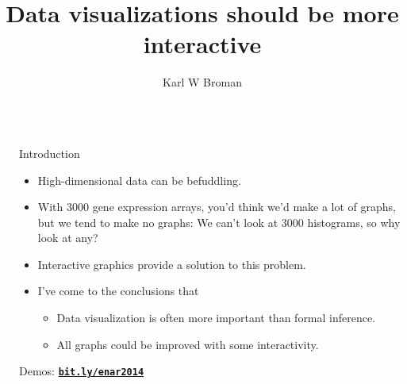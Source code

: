 \documentclass[final,plain]{beamer}
\title{Data visualizations should be more interactive}
\author{Karl W Broman}
\institute{Biostatistics \&
  Medical Informatics, University of Wisconsin--Madison}
\newlength{\sepwid}
\newlength{\onecolwid}
\newcommand{\bi}{\begin{itemize}}
\newcommand{\ei}{\end{itemize}}
\newcommand{\bluebold}{\color{dblue} \bf}
\newcommand{\colonevsep}{\vspace{16mm}}
\newcommand{\hilit}{\color{mypurple}}
\begin{document}
\begin{frame}[t]

\begin{columns}[t]
  \begin{column}{\sepwid}\end{column} %

  \begin{column}{\onecolwid}

    \begin{exampleblock}{\Large Introduction}{
        \bi \itemsep18pt
        \item High-dimensional data can be {\hilit befuddling}.
        \item With 3000 gene expression arrays, you'd think we'd make
          {\hilit a lot} of graphs, but we tend to make {\hilit no}
          graphs: We can't look at 3000 histograms, so why look at any?
        \item {\hilit Interactive graphics} provide a solution to this problem.
        \item I've come to the conclusions that
          \vspace{8pt}
           \bi \itemsep14pt
           \item Data visualization is often more important than
             formal inference.
           \item All graphs could be improved with some interactivity.
           \ei
        \ei

     \vspace{18pt}

        \centerline{Demos:
        \href{http://www.biostat.wisc.edu/~kbroman/posters/ENAR2014}{\tt \textbf{bit.ly/enar2014}}}

     }
    \end{exampleblock}


  \colonevsep %

\end{column}
\end{columns}
\end{frame}
\end{document}
